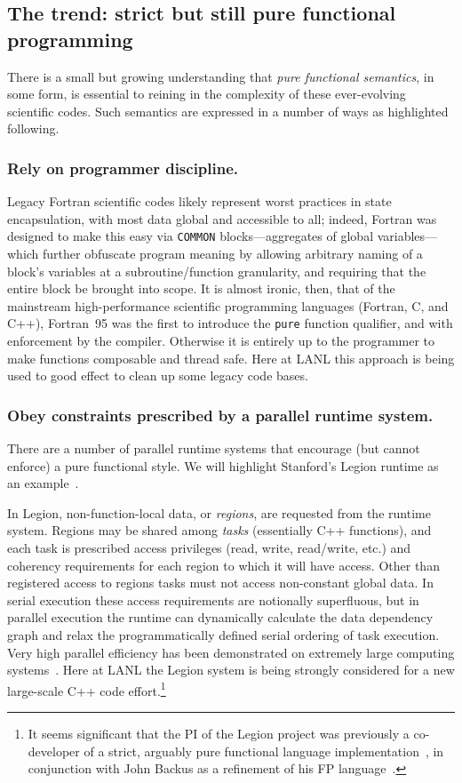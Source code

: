 \documentclass{llncs}
\begin{document}
\subsection{The trend: strict but still pure functional programming}
There is a small but growing understanding that \emph{pure functional
  semantics}, in some form, is essential to reining in the complexity of these
ever-evolving scientific codes.  Such semantics are expressed in a number
of ways as highlighted following.

\subsubsection{Rely on programmer discipline.}
Legacy Fortran scientific codes likely represent worst practices in state
encapsulation, with most data global and accessible to all; indeed, Fortran
was designed to make this easy via \texttt{COMMON} blocks---aggregates of
global variables---which further obfuscate program meaning by allowing
arbitrary naming of a block's variables at a subroutine/function granularity,
and requiring that the entire block be brought into scope.  It is almost
ironic, then, that of the mainstream high-performance scientific programming
languages (Fortran, C, and C++), Fortran~95 was the first to introduce the
\texttt{pure} function qualifier, and with enforcement by the compiler.
Otherwise it is entirely up to the programmer to make functions composable and
thread safe.  Here at LANL this approach is being used to good effect to clean
up some legacy code bases.

\subsubsection{Obey constraints prescribed by a parallel runtime system.}
There are a number of parallel runtime systems that encourage (but cannot
enforce) a pure functional style.  We will highlight Stanford's Legion
runtime as an example~\cite{Bauer12}.

In Legion, non-function-local data, or \emph{regions}, are requested from the
runtime system.  Regions may be shared among \emph{tasks} (essentially C++
functions), and each task is prescribed access privileges (read, write,
read/write, etc.)  and coherency requirements for each region to which it will
have access.  Other than registered access to regions tasks must not access
non-constant global data.  In serial execution these access requirements are
notionally superfluous, but in parallel execution the runtime can dynamically
calculate the data dependency graph and relax the programmatically defined
serial ordering of task execution.  Very high parallel efficiency has been
demonstrated on extremely large computing systems~\cite{Bauer14}.  Here at
LANL the Legion system is being strongly considered for a new large-scale C++
code effort.\footnote{It seems significant that the PI of the Legion
  project was previously a co-developer of a strict, arguably pure functional
  language implementation~\cite{AikenFL,FLreport89}, in conjunction with
John Backus as a refinement of his FP language~\cite{Backus:1978}.}
\end{document}

